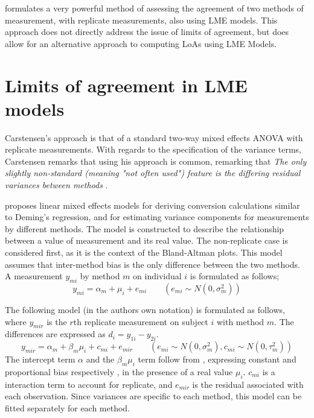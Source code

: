 \documentclass[12pt, a4paper]{report}
\theoremstyle{plain}
\theoremstyle{definition}
\theoremstyle{remark}
\begin{document}
\citet{ARoy2009} formulates a very powerful method of assessing the agreement of two methods of measurement, with replicate measurements, also using LME models. This approach does not directly address the issue of limits of agreement, but does allow for an alternative approach to computing LoAs using LME Models.

\section{Limits of agreement in LME models}

Carstensen's approach is that of a standard two-way mixed effects ANOVA with replicate measurements. With regards to the specification of the variance terms, Carstensen remarks that using his approach is common, remarking that \emph{
	The only slightly non-standard (meaning "not often used") feature is the differing residual variances between methods }\citep{BXC2010}.

\citet{BXC2004} proposes linear mixed effects models for deriving
conversion calculations similar to Deming's regression, and for
estimating variance components for measurements by different
methods. The model is constructed to
describe the relationship between a value of measurement and its
real value. The non-replicate case is considered first, as it is
the context of the Bland-Altman plots. This model assumes that
inter-method bias is the only difference between the two methods.
A measurement $y_{mi}$ by method $m$ on individual $i$ is
formulated as follows;
\begin{equation}
y_{mi}  = \alpha_{m} + \mu_{i} + e_{mi} \qquad ( e_{mi} \sim
N(0,\sigma^{2}_{m}))
\end{equation}

The following model (in the authors own notation) is
formulated as follows, where $y_{mir}$ is the $r$th replicate
measurement on subject $i$ with method $m$. The differences are expressed as $d_{i} = y_{1i} - y_{2i}$.
\begin{equation}
	y_{mir}  = \alpha_{m} + \beta_{m}\mu_{i} + c_{mi} + e_{mir} \qquad
	( e_{mi} \sim N(0,\sigma^{2}_{m}), c_{mi} \sim N(0,\tau^{2}_{m}))
\end{equation}
The intercept term $\alpha$ and the $\beta_{m}\mu_{i}$ term follow
from \citet{DunnSEME}, expressing constant and proportional bias
respectively , in the presence of a real value $\mu_{i}.$
$c_{mi}$ is a interaction term to account for replicate, and
$e_{mir}$ is the residual associated with each observation.
Since variances are specific to each method, this model can be
fitted separately for each method.
\end{document}
